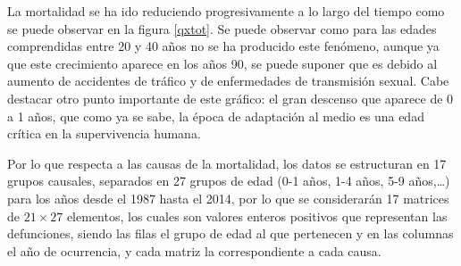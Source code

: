\documentclass{article}
\begin{document}
La mortalidad se ha ido reduciendo progresivamente a lo largo del tiempo como se puede observar en la figura \ref{qxtot}. Se puede observar como para las edades comprendidas entre 20 y 40 años no se ha producido este fenómeno, aunque ya que este crecimiento aparece en los años 90, se puede suponer que es debido al aumento de accidentes de tráfico y de enfermedades de transmisión sexual. Cabe destacar otro punto importante de este gráfico: el gran descenso que aparece de 0 a 1 años, que como ya se sabe, la época de adaptación al medio es una edad crítica en la supervivencia humana.



\vspace{0.3cm}

Por lo que respecta a las causas de la mortalidad, los datos se estructuran en 17 grupos causales, separados en 27 grupos de edad (0-1 años, 1-4 años, 5-9 años,\dots) para los años desde el 1987 hasta el 2014, por lo que se considerarán 17 matrices de $21\times 27$ elementos, los cuales son valores enteros positivos que representan las defunciones, siendo las filas el grupo de edad al que pertenecen y en las columnas el año de ocurrencia, y cada matriz la correspondiente a cada causa.
\end{document}
